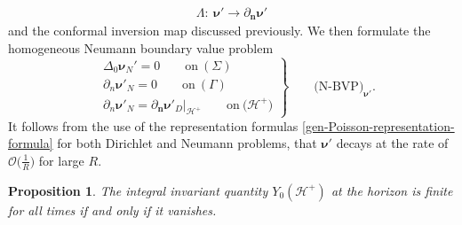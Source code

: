 \documentclass[pdftex]{sigma}
\def\ptl{\partial}%
\def\mbo#1{\boldsymbol{#1}}%
\numberwithin{equation}{section}
\newtheorem{Proposition}[Theorem]{Proposition}
\begin{document}
\begin{align*}
\Lambda \colon\ \mbo{\nu'} \to \ptl_{\mbo{n}} \mbo{\nu}'
\end{align*}
 and the conformal inversion map discussed previously. We then formulate the homogeneous Neumann boundary value problem
\begin{equation*}
\left.\begin{aligned}
&\Delta_0 \mbo{\nu}_N'=0 \qquad \text{on} \ (\Sigma)\\
&\ptl_n \mbo{\nu}'_N=0 \qquad \text{on} \ (\Gamma) \\
&\ptl_n \mbo{\nu}'_N= \ptl_{\mbo{n}} \mbo{\nu}'_D \big\vert_{\mathcal{H}^+} \qquad \text{on} \ \bigl(\mathcal{H}^{+}\bigr)
\end{aligned}
 \right\}
\qquad \text{(N-BVP)}_{\mbo{\nu'}}.
\end{equation*}
It follows from the use of the representation formulas \eqref{gen-Poisson-representation-formula} for both Dirichlet and Neumann problems, that $\mbo{\nu}'$ decays at the rate of $\mathcal{O}\bigl(\frac{1}{R}\bigr)$ for large $R$.
\begin{Proposition}
	The integral invariant quantity $Y_0(\mathcal{H}^+)$ at the horizon is finite for all times if and only if it vanishes.
\end{Proposition}
\end{document}

